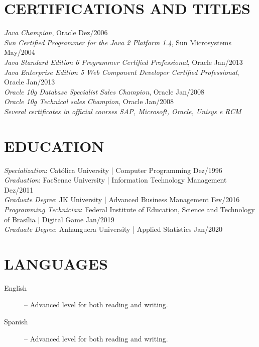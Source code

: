 \documentclass{res}
\begin{document}
\begin{resume}
		\section{CERTIFICATIONS AND TITLES}
		\vspace{8pt}
		{\sl Java Champion}, Oracle \hfill Dez/2006 \\
		{\sl Sun Certified Programmer for the Java 2 Platform 1.4}, Sun Microsystems \hfill May/2004 \\
		{\sl Java Standard Edition 6 Programmer Certified Professional}, Oracle \hfill Jan/2013 \\
		{\sl Java Enterprise Edition 5 Web Component Developer Certified Professional}, Oracle \hfill Jan/2013 \\
		{\sl Oracle 10g Database Specialist Sales Champion}, Oracle \hfill Jan/2008 \\
		{\sl Oracle 10g Technical sales Champion}, Oracle \hfill Jan/2008 \\
		{\sl Several certificates in official courses SAP, Microsoft, Oracle, Unisys e RCM}
		
		\section{EDUCATION}
		\vspace{8pt} 
		{\sl Specialization}: Católica University | Computer Programming
		\hfill Dez/1996 \\
		{\sl Graduation}: FacSenac University | Information Technology Management
		\hfill Dez/2011 \\
		{\sl Graduate Degree}: JK University | Advanced Business Management 
		\hfill Fev/2016 \\
		{\sl Programming Technician}: Federal Institute of Education, Science and Technology of Brasília | Digital Game
		\hfill Jan/2019 \\		
		{\sl Graduate Degree}: Anhanguera University | Applied Statistics
		\hfill Jan/2020
		
		\section{LANGUAGES} 
		\vspace{18pt}
		\begin{description}
			\item[English] -- Advanced level for both reading and writing.
			\item[Spanish] -- Advanced level for both reading and writing.
		\end{description}
		

\end{resume}
\end{document}
